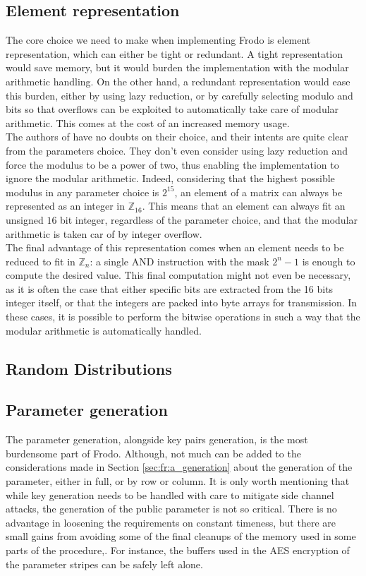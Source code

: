 \subsection{Element representation}
The core choice we need to make when implementing Frodo is element representation, which can either be tight or redundant. A tight representation would save memory, but it would burden the implementation with the modular arithmetic handling. On the other hand, a redundant representation would ease this burden, either by using lazy reduction, or by carefully selecting modulo and bits so that overflows can be exploited to automatically take care of modular arithmetic. This comes at the cost of an increased memory usage.\\
The authors of \cite{frodo} have no doubts on their choice, and their intents are quite clear from the parameters choice. They don't even consider using lazy reduction and force the modulus to be a power of two, thus enabling the implementation to ignore the modular arithmetic. Indeed, considering that the highest possible modulus in any parameter choice is $2^{15}$, an element of a matrix can always be represented as an integer in $\mathbb{Z}_{16}$. This means that an element can always fit an unsigned $16$ bit integer, regardless of the parameter choice, and that the modular arithmetic is taken car of by integer overflow.\\
The final advantage of this representation comes when an element needs to be reduced to fit in $\mathbb{Z}_n$: a single AND instruction with the mask $2^{n}-1$ is enough to compute the desired value. This final computation might not even be necessary, as it is often the case that either specific bits are extracted from the 16 bits integer itself, or that the integers are packed into byte arrays for transmission. In these cases, it is possible to perform the bitwise operations in such a way that the modular arithmetic is automatically handled.\\

\subsection{Random Distributions}\label{sec:imp:distributions}


\subsection{Parameter generation}
The parameter generation, alongside key pairs generation, is the most burdensome part of Frodo. Although, not much can be added to the considerations made in Section \ref{sec:fr:a_generation} about the generation of the parameter, either in full, or by row or column. It is only worth mentioning that while key generation needs to be handled with care to mitigate side channel attacks, the generation of the public parameter is not so critical. There is no advantage in loosening the requirements on constant timeness, but there are small gains from avoiding some of the final cleanups of the memory used in some parts of the procedure,. For instance, the buffers used in the AES encryption of the parameter stripes can be safely left alone.\\

